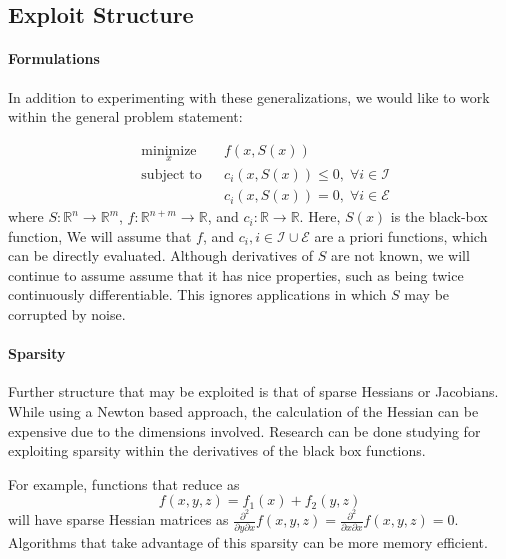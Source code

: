 \documentclass{article}
\begin{document}
\subsection{Exploit Structure}

\paragraph{Formulations}
In addition to experimenting with these generalizations,
 we would like to work within the general problem statement:

\begin{equation*}
\begin{aligned}
& \underset{x}{\text{minimize}} & & f(x, S(x)) \\
& \text{subject to} & & c_i(x, S(x)) \leq 0, \; \forall i \in \mathcal{I} \\
& & & c_i(x, S(x)) = 0, \; \forall i \in \mathcal{E}
\end{aligned}
\end{equation*}
where
$S  : \mathbb{R}^n \to \mathbb{R}^m$,
$f  : \mathbb{R}^{n+m} \to \mathbb{R}$, and
$c_i: \mathbb{R} \to \mathbb{R}$.
Here, $S(x)$ is the black-box function, 
We will assume that  $f$, and $c_i, i \in \mathcal I \cup \mathcal E$ are a priori functions, which can be directly evaluated.
Although derivatives of $S$ are not known, we will continue to assume assume that it has nice properties, such as being twice continuously differentiable.
This ignores applications in which $S$ may be corrupted by noise.

\paragraph{Sparsity}
Further structure that may be exploited is that of sparse Hessians or Jacobians.
While using a Newton based approach, the calculation of the Hessian can be expensive due to the dimensions involved.
Research can be done studying for exploiting sparsity within the derivatives of the black box functions.

For example, functions that reduce as
\[
f(x, y, z) = f_1(x) + f_2(y,z)
\]
will have sparse Hessian matrices as $\frac{\partial^2}{\partial y\partial x}f(x,y,z) = \frac{\partial^2}{\partial x\partial x}f(x,y,z) = 0$.
Algorithms that take advantage of this sparsity can be more memory efficient.




\end{document}
